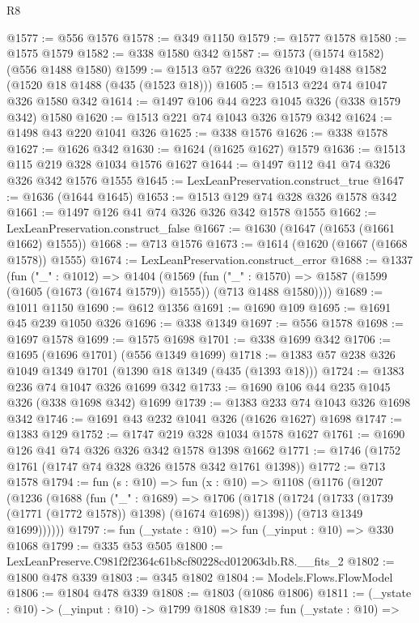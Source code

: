 \begin{lexlean}{R8}
\begin{coremodule}
@1577 := @556 @1576
@1578 := @349 @1150
@1579 := @1577 @1578
@1580 := @1575 @1579
@1582 := @338 @1580 @342
@1587 := @1573 (@1574 @1582) (@556 @1488 @1580)
@1599 := @1513 @57 @226 @326 @1049 @1488 @1582 (@1520 @18 @1488 (@435 (@1523 @18)))
@1605 := @1513 @224 @74 @1047 @326 @1580 @342
@1614 := @1497 @106 @44 @223 @1045 @326 (@338 @1579 @342) @1580
@1620 := @1513 @221 @74 @1043 @326 @1579 @342
@1624 := @1498 @43 @220 @1041 @326
@1625 := @338 @1576
@1626 := @338 @1578
@1627 := @1626 @342
@1630 := @1624 (@1625 @1627) @1579
@1636 := @1513 @115 @219 @328 @1034 @1576 @1627
@1644 := @1497 @112 @41 @74 @326 @326 @342 @1576 @1555
@1645 := LexLeanPreservation.construct_true
@1647 := @1636 (@1644 @1645)
@1653 := @1513 @129 @74 @328 @326 @1578 @342
@1661 := @1497 @126 @41 @74 @326 @326 @342 @1578 @1555
@1662 := LexLeanPreservation.construct_false
@1667 := @1630 (@1647 (@1653 (@1661 @1662) @1555))
@1668 := @713 @1576
@1673 := @1614 (@1620 (@1667 (@1668 @1578)) @1555)
@1674 := LexLeanPreservation.construct_error
@1688 := @1337
    (fun ("_" : @1012) =>
    @1404
      (@1569
        (fun ("_" : @1570) =>
        @1587 (@1599 (@1605 (@1673 (@1674 @1579)) @1555)) (@713 @1488 @1580))))
@1689 := @1011 @1150
@1690 := @612 @1356
@1691 := @1690 @109
@1695 := @1691 @45 @239 @1050 @326
@1696 := @338 @1349
@1697 := @556 @1578
@1698 := @1697 @1578
@1699 := @1575 @1698
@1701 := @338 @1699 @342
@1706 := @1695 (@1696 @1701) (@556 @1349 @1699)
@1718 := @1383 @57 @238 @326 @1049 @1349 @1701 (@1390 @18 @1349 (@435 (@1393 @18)))
@1724 := @1383 @236 @74 @1047 @326 @1699 @342
@1733 := @1690 @106 @44 @235 @1045 @326 (@338 @1698 @342) @1699
@1739 := @1383 @233 @74 @1043 @326 @1698 @342
@1746 := @1691 @43 @232 @1041 @326 (@1626 @1627) @1698
@1747 := @1383 @129
@1752 := @1747 @219 @328 @1034 @1578 @1627
@1761 := @1690 @126 @41 @74 @326 @326 @342 @1578 @1398 @1662
@1771 := @1746 (@1752 @1761 (@1747 @74 @328 @326 @1578 @342 @1761 @1398))
@1772 := @713 @1578
@1794 := fun (s : @10) =>
  fun (x : @10) =>
  @1108
    (@1176
      (@1207
        (@1236
          (@1688
            (fun ("_" : @1689) =>
            @1706
              (@1718 (@1724 (@1733 (@1739 (@1771 (@1772 @1578)) @1398) (@1674 @1698)) @1398))
              (@713 @1349 @1699))))))
@1797 := fun (_ystate : @10) => fun (_yinput : @10) => @330 @1068
@1799 := @335 @53 @505
@1800 := LexLeanPreserve.C981f2f2364c61b8cf80228cd012063db.R8.__fits_2
@1802 := @1800 @478 @339
@1803 := @345 @1802
@1804 := Models.Flows.FlowModel
@1806 := @1804 @478 @339
@1808 := @1803 (@1086 @1806)
@1811 := (_ystate : @10) -> (_yinput : @10) -> @1799 @1808
@1839 := fun (_ystate : @10) =>

\end{coremodule}
\end{lexlean}
